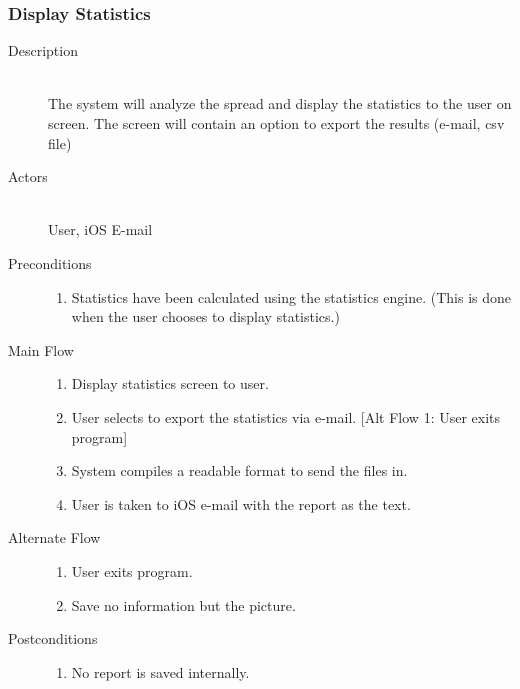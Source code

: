 \subsubsection{Display Statistics}
\begin{description}
    \item[Description] \hfill \\
        The system will analyze the spread and display the statistics to the user on screen.  The screen will contain an option to export the results (e-mail, csv file)
    \item[Actors] \hfill \\
        User, iOS E-mail
    \item[Preconditions] \hfill 
        \begin{enumerate}
            \item Statistics have been calculated using the statistics engine. (This is done when the user chooses to display statistics.)
        \end{enumerate}
    \item[Main Flow] \hfill 
        \begin{enumerate}
            \item Display statistics screen to user.
            \item User selects to export the statistics via e-mail.
                [Alt Flow 1: User exits program]
            \item System compiles a readable format to send the files in.
            \item User is taken to iOS e-mail with the report as the text.
        \end{enumerate}
    \item[Alternate Flow] \hfill 
        \begin{enumerate}
            \item User exits program.
            \item Save no information but the picture.
        \end{enumerate}
    \item[Postconditions] \hfill
        \begin{enumerate}
            \item No report is saved internally.
        \end{enumerate}
\end{description}
